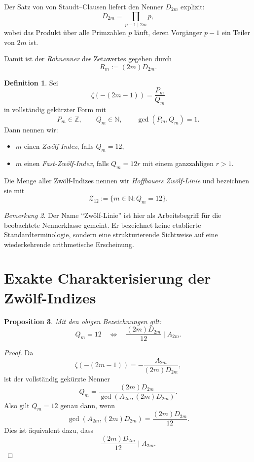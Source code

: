 \documentclass[11pt,a4paper]{article}
\theoremstyle{definition}
\newtheorem{definition}{Definition}[section]
\theoremstyle{plain}
\newtheorem{proposition}[definition]{Proposition}
\theoremstyle{remark}
\newtheorem{bemerkung}[definition]{Bemerkung}
\begin{document}
	Der Satz von von Staudt--Clausen liefert den Nenner $D_{2m}$ explizit:
	\[
	D_{2m}=\prod_{p-1\mid 2m} p,
	\]
	wobei das Produkt über alle Primzahlen $p$ läuft, deren Vorgänger $p-1$ ein Teiler von $2m$ ist.
	
	Damit ist der \emph{Rohnenner} des Zetawertes gegeben durch
	\[
	R_m:=(2m)D_{2m}.
	\]
	
	\begin{definition}
		Sei
		\[
		\zeta(-(2m-1))=\frac{P_m}{Q_m}
		\]
		in vollständig gekürzter Form mit
		\[
		P_m\in\mathbb{Z},\qquad Q_m\in\mathbb{N},\qquad \gcd(P_m,Q_m)=1.
		\]
		Dann nennen wir:
		\begin{itemize}
			\item $m$ einen \emph{Zwölf-Index}, falls $Q_m=12$,
			\item $m$ einen \emph{Fast-Zwölf-Index}, falls $Q_m=12r$ mit einem ganzzahligen $r>1$.
		\end{itemize}
		Die Menge aller Zwölf-Indizes nennen wir \emph{Hoffbauers Zwölf-Linie} und bezeichnen sie mit
		\[
		\mathcal Z_{12}:=\{m\in\mathbb N : Q_m=12\}.
		\]
	\end{definition}
	
	\begin{bemerkung}
		Der Name ``Zwölf-Linie'' ist hier als Arbeitsbegriff für die beobachtete Nennerklasse gemeint. Er bezeichnet keine etablierte Standardterminologie, sondern eine strukturierende Sichtweise auf eine wiederkehrende arithmetische Erscheinung.
	\end{bemerkung}
	
	\section{Exakte Charakterisierung der Zwölf-Indizes}
	
	\begin{proposition}
		Mit den obigen Bezeichnungen gilt:
		\[
		Q_m=12
		\quad\Longleftrightarrow\quad
		\frac{(2m)D_{2m}}{12}\mid A_{2m}.
		\]
	\end{proposition}
	
	\begin{proof}
		Da
		\[
		\zeta(-(2m-1))=-\frac{A_{2m}}{(2m)D_{2m}},
		\]
		ist der vollständig gekürzte Nenner
		\[
		Q_m=\frac{(2m)D_{2m}}{\gcd(A_{2m},(2m)D_{2m})}.
		\]
		Also gilt $Q_m=12$ genau dann, wenn
		\[
		\gcd(A_{2m},(2m)D_{2m})=\frac{(2m)D_{2m}}{12}.
		\]
		Dies ist äquivalent dazu, dass
		\[
		\frac{(2m)D_{2m}}{12}\mid A_{2m}.
		\]
	\end{proof}
	
\end{document}
